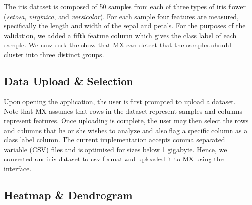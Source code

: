 \documentclass[12pt]{article}
\begin{document}
The iris dataset is composed of 50 samples from each of three types of iris flower (\textit{setosa}, \textit{virginica}, and \textit{versicolor}). For each sample four features are measured, specifically the length and width of the sepal and petals. For the purposes of the validation, we added a fifth feature column which gives the class label of each sample. We now seek the show that MX can detect that the samples should cluster into three distinct groups.

\subsection{Data Upload \& Selection}
\label{subsec:SubSecUpload}

Upon opening the application, the user is first prompted to upload a dataset. Note that MX assumes that rows in the dataset represent samples and columns represent features. Once uploading is complete, the user may then select the rows and columns that he or she wishes to analyze and also flag a specific column as a class label column. The current implementation accepts comma separated variable (CSV) files and is optimized for sizes below 1 gigabyte. Hence, we converted our iris dataset to csv format and uploaded it to MX using the interface.

\subsection{Heatmap \& Dendrogram}
\label{subsec:SubSecHeatmap}
\end{document}
